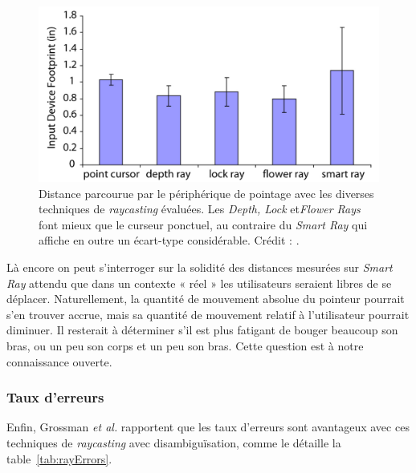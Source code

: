 	\begin{figure}[ht]
		\centering
		\includegraphics[width=\textwidth]{figures/ch2/rayFootprint}
		\caption[Distance parcourue par le périphérique avec les diverses techniques de \emph{raycasting} évaluées]{Distance parcourue par le périphérique de pointage avec les diverses techniques de \emph{raycasting} évaluées. Les \emph{Depth, Lock} et\emph{Flower Rays} font mieux que le curseur ponctuel, au contraire du \emph{Smart Ray} qui affiche en outre un écart-type considérable. Crédit : \cite{grossman2006design}.}
		\label{fig:rayFootprint}
	\end{figure}
	
	Là encore on peut s'interroger sur la solidité des distances mesurées sur \emph{Smart Ray} attendu que dans un contexte « réel » les utilisateurs seraient libres de se déplacer. Naturellement, la quantité de mouvement absolue du pointeur pourrait s'en trouver accrue, mais sa quantité de mouvement relatif à l'utilisateur pourrait diminuer. Il resterait à déterminer s'il est plus fatigant de bouger beaucoup son bras, ou un peu son corps et un peu son bras. Cette question est à notre connaissance ouverte.
	
	\subsubsection{Taux d'erreurs}
	Enfin, Grossman \emph{et al.} rapportent que les taux d'erreurs sont avantageux avec ces techniques de \emph{raycasting} avec disambiguïsation, comme le détaille la table~\ref{tab:rayErrors}.
	
